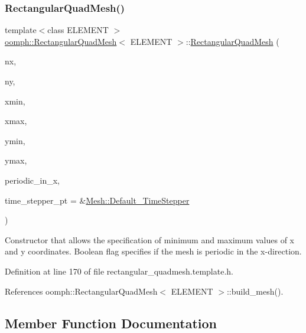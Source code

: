 \subsubsection{\texorpdfstring{Rectangular\+Quad\+Mesh()}{RectangularQuadMesh()}\hspace{0.1cm}{\footnotesize\ttfamily [5/5]}}
{\footnotesize\ttfamily template$<$class E\+L\+E\+M\+E\+NT $>$ \\
\hyperlink{classoomph_1_1RectangularQuadMesh}{oomph\+::\+Rectangular\+Quad\+Mesh}$<$ E\+L\+E\+M\+E\+NT $>$\+::\hyperlink{classoomph_1_1RectangularQuadMesh}{Rectangular\+Quad\+Mesh} (\begin{DoxyParamCaption}\item[{const unsigned \&}]{nx,  }\item[{const unsigned \&}]{ny,  }\item[{const double \&}]{xmin,  }\item[{const double \&}]{xmax,  }\item[{const double \&}]{ymin,  }\item[{const double \&}]{ymax,  }\item[{const bool \&}]{periodic\+\_\+in\+\_\+x,  }\item[{\hyperlink{classoomph_1_1TimeStepper}{Time\+Stepper} $\ast$}]{time\+\_\+stepper\+\_\+pt = {\ttfamily \&\hyperlink{classoomph_1_1Mesh_a12243d0fee2b1fcee729ee5a4777ea10}{Mesh\+::\+Default\+\_\+\+Time\+Stepper}} }\end{DoxyParamCaption})\hspace{0.3cm}{\ttfamily [inline]}}



Constructor that allows the specification of minimum and maximum values of x and y coordinates. Boolean flag specifies if the mesh is periodic in the x-\/direction. 



Definition at line 170 of file rectangular\+\_\+quadmesh.\+template.\+h.



References oomph\+::\+Rectangular\+Quad\+Mesh$<$ E\+L\+E\+M\+E\+N\+T $>$\+::build\+\_\+mesh().



\subsection{Member Function Documentation}
\mbox{\label{classoomph_1_1RectangularQuadMesh_afa579b413a2d8120e8228d840cb3582c}} 
